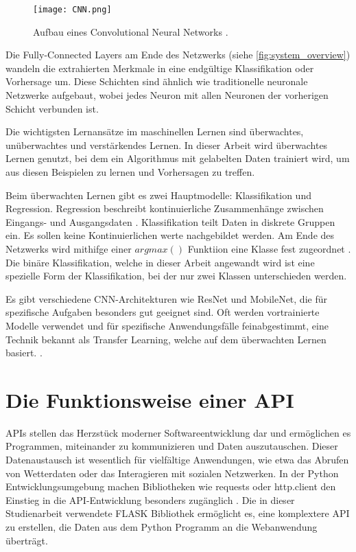 \begin{figure}[h]
    \centering
    \texttt{[image: CNN.png]}
    \caption{Aufbau eines Convolutional Neural Networks \cite{finbridgede_computer_2022}.}
    \label{fig:system_overview}
\end{figure}

Die Fully-Connected Layers am Ende des Netzwerks (siehe \autoref{fig:system_overview}) wandeln die extrahierten Merkmale in eine endgültige Klassifikation oder Vorhersage um. Diese Schichten sind ähnlich wie traditionelle neuronale Netzwerke aufgebaut, wobei jedes Neuron mit allen Neuronen der vorherigen Schicht verbunden ist.

Die wichtigsten Lernansätze im maschinellen Lernen sind überwachtes, unüberwachtes und verstärkendes Lernen. In dieser Arbeit wird überwachtes Lernen genutzt, bei dem ein Algorithmus mit gelabelten Daten trainiert wird, um aus diesen Beispielen zu lernen und Vorhersagen zu treffen.

Beim überwachten Lernen gibt es zwei Hauptmodelle: Klassifikation und Regression. Regression beschreibt kontinuierliche Zusammenhänge zwischen Eingangs- und Ausgangsdaten \cite{noauthor_machine_nodate-1}. Klassifikation teilt Daten in diskrete Gruppen ein. Es sollen keine Kontinuierlichen werte nachgebildet werden. Am Ende des Netzwerks wird mithifge einer $argmax()$ Funktiion eine Klasse fest zugeordnet \cite[S. 450]{suse_bildverarbeitung_2014}. Die binäre Klassifikation, welche in dieser Arbeit angewandt wird ist eine spezielle Form der Klassifikation, bei der nur zwei Klassen unterschieden werden.

Es gibt verschiedene CNN-Architekturen wie ResNet und MobileNet, die für spezifische Aufgaben besonders gut geeignet sind. Oft werden vortrainierte Modelle verwendet und für spezifische Anwendungsfälle feinabgestimmt, eine Technik bekannt als Transfer Learning, welche auf dem überwachten Lernen basiert. \cite{finbridgede_computer_2022}.

\section{Die Funktionsweise einer API} \label{sec:api}  %

APIs stellen das Herzstück moderner Softwareentwicklung dar und ermöglichen es Programmen, miteinander zu kommunizieren und Daten auszutauschen. Dieser Datenaustausch ist wesentlich für vielfältige Anwendungen, wie etwa das Abrufen von Wetterdaten oder das Interagieren mit sozialen Netzwerken. In der Python Entwicklungsumgebung machen Bibliotheken wie requests oder http.client den Einstieg in die API-Entwicklung besonders zugänglich \cite{software_mittelstand_erste_nodate}. Die in dieser Studienarbeit verwendete FLASK Bibliothek ermöglicht es, eine komplextere API zu erstellen, die Daten aus dem Python Programm an die Webanwendung überträgt.

